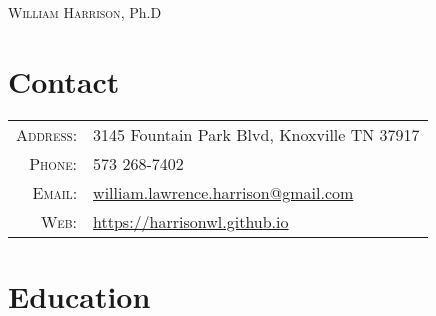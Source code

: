 \documentclass[11pt]{article}
\begin{document}

\pagestyle{empty} %


\par{\centering
		{\Huge \textsc{William Harrison}, Ph.D
	}\bigskip
	\par}


\section{Contact}

\begin{tabular}{rl}
    \textsc{Address:}   & 3145 Fountain Park Blvd, Knoxville TN 37917 \\
    \textsc{Phone:}     & 573 268-7402\\
    \textsc{Email:}     & \href{mailto:william.lawrence.harrison@gmail.com}{william.lawrence.harrison@gmail.com}\\
    \textsc{Web:}       & \href{https://harrisonwl.github.io}{https://harrisonwl.github.io}
\end{tabular}

\section{Education}
\end{document}

